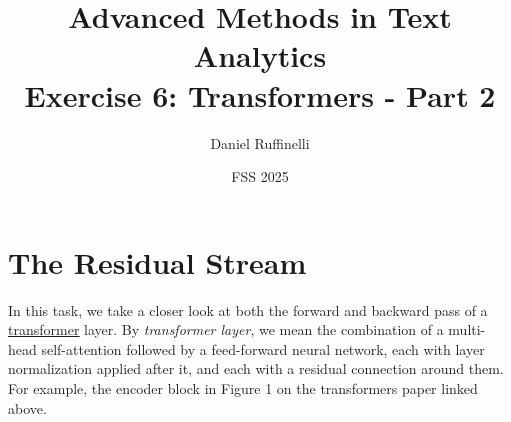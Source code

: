 \documentclass[11pt,a4paper]{article}
\title{Advanced Methods in Text Analytics \\ 
Exercise 6: Transformers - Part 2}
\author{Daniel Ruffinelli}
\date{FSS 2025}
\begin{document}
\maketitle

\section{The Residual Stream}

In this task, we take a closer look at both the forward and backward pass of a
\href{https://arxiv.org/pdf/1706.03762}{\underline{transformer}} layer.
By \emph{transformer layer}, we mean the combination of a multi-head
self-attention followed by a feed-forward neural network, each with layer
normalization applied after it, and each with a residual connection around them.
For example, the encoder block in Figure 1 on the transformers paper linked
above.
\end{document}
